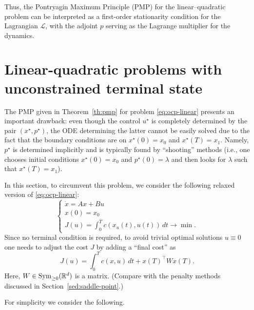 Thus, the Pontryagin Maximum Principle (PMP) for the linear–quadratic problem can be interpreted as a first-order stationarity condition for the Lagrangian $\mathcal{L}$, with the adjoint $p$ serving as the Lagrange multiplier for the dynamics.

\section{Linear-quadratic problems with unconstrained terminal state}

The PMP given in Theorem~\ref{th:pmp} for problem \eqref{eq:ocp-linear} presents an important drawback: even though the control $u^\star$ is completely determined by the pair $(x^\star,p^\star)$, the ODE determining the latter cannot be easily solved due to the fact that the boundary conditions are on $x^\star(0)=x_0$ and $x^\star (T)=x_1$. 
Namely, $p^\star$ is determined implicitly and is typically found by ``shooting'' methods (i.e., one chooses initial conditions $x^\star(0)=x_0$ and $p^\star(0)=\lambda$ and then looks for $\lambda$ such that $x^\star(T)=x_1$).

In this section, to circumvent this problem, we consider the following relaxed version of \eqref{eq:ocp-linear}:
\begin{equation}
   \label{eq:ocp-linear-no-terminal}
   \begin{cases}
    \dot x = A x + Bu \\
    x(0)=x_0 \\
    J(u) = \int_0^T c(x_u(t),u(t))\, dt \rightarrow \min.
   \end{cases} 
\end{equation}
Since no terminal condition is required, to avoid trivial optimal solutions $u\equiv 0$ one needs to adjust the cost $J$ by adding a ``final cost'' as
\begin{equation}
    \label{eq:J-no-terminal}
    J(u) = \int_0^T c(x,u)\, dt + x(T)^\top W x(T).
\end{equation}
Here, $W\in \operatorname{Sym}_{\ge 0}(\mathbb{R}^d)$ is a matrix. 
(Compare with the penalty methods discussed in Section~\ref{sed:saddle-point}.)

For simplicity we consider the following.


